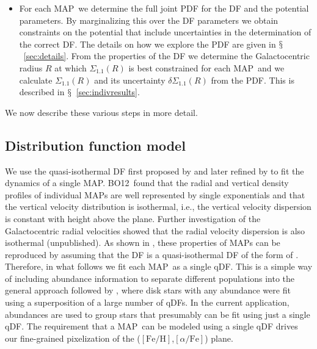 \documentclass{emulateapj}
\newcommand{\ie}{i.e.}
\newcommand{\sectionname}{$\mathsection$}
\newcommand{\feh}{\ensuremath{[\mathrm{Fe/H}]}}
\newcommand{\afe}{\ensuremath{[\alpha\mathrm{/Fe}]}}
\newcommand{\map}{MAP}
\newcommand{\sigoneone}{\ensuremath{\Sigma_{1.1}}}
\newcommand{\bo}{BO12}
\begin{document}
\begin{itemize}
\item For each \map\ we determine the full joint PDF for the DF and
  the potential parameters. By marginalizing this over the DF
  parameters we obtain constraints on the potential that include
  uncertainties in the determination of the correct DF. The details on
  how we explore the PDF are given in
  \sectionname~\ref{sec:details}. From the properties of the DF we
  determine the Galactocentric radius $R$ at which $\sigoneone(R)$ is
  best constrained for each \map\ and we calculate $\sigoneone(R)$ and
  its uncertainty $\delta \sigoneone(R)$ from the PDF. This is
  described in \sectionname~\ref{sec:indivresults}.

\end{itemize}

We now describe these various steps in more detail.

\subsection{Distribution function model}\label{sec:qdf}

We use the quasi-isothermal DF first proposed by \citet{Binney10a} and
later refined by \citet{Binney11a} to fit the dynamics of a single
\map. \bo\ found that the radial and vertical density profiles of
individual \map s are well represented by single exponentials and that
the vertical velocity distribution is isothermal, \ie, the vertical
velocity dispersion is constant with height above the plane. Further
investigation of the Galactocentric radial velocities showed that the
radial velocity dispersion is also isothermal (unpublished). As shown
in \citet{Ting13a}, these properties of \map s can be reproduced by
assuming that the DF is a quasi-isothermal DF of the form of
\citet{Binney11a}. Therefore, in what follows we fit each \map\ as a
single qDF. This is a simple way of including abundance information to
separate different populations into the general approach followed by
\citet{Binney12b}, where disk stars with any abundance were fit using
a superposition of a large number of qDFs. In the current application,
abundances are used to group stars that presumably can be fit using
just a single qDF. The requirement that a \map\ can be modeled using a
single qDF drives our fine-grained pixelization of the (\feh,\afe)
plane.
\end{document}
